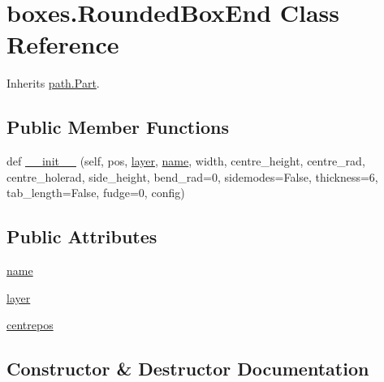 \hypertarget{classboxes_1_1_rounded_box_end}{}\section{boxes.\+Rounded\+Box\+End Class Reference}
\label{classboxes_1_1_rounded_box_end}


Inherits \hyperlink{classpath_1_1_part}{path.\+Part}.

\subsection*{Public Member Functions}
\begin{DoxyCompactItemize}
\item 
def \hyperlink{classboxes_1_1_rounded_box_end_a59c1d8804a33c525d582be8c4667f7ce}{\+\_\+\+\_\+init\+\_\+\+\_\+} (self, pos, \hyperlink{classboxes_1_1_rounded_box_end_a7c010d7f52ed873fb0cac5a8d9d66ef9}{layer}, \hyperlink{classboxes_1_1_rounded_box_end_a45d2a6098b926041ff90261c3a91812d}{name}, width, centre\+\_\+height, centre\+\_\+rad, centre\+\_\+holerad, side\+\_\+height, bend\+\_\+rad=0, sidemodes=False, thickness=6, tab\+\_\+length=False, fudge=0, config)
\end{DoxyCompactItemize}
\subsection*{Public Attributes}
\begin{DoxyCompactItemize}
\item 
\hyperlink{classboxes_1_1_rounded_box_end_a45d2a6098b926041ff90261c3a91812d}{name}
\item 
\hyperlink{classboxes_1_1_rounded_box_end_a7c010d7f52ed873fb0cac5a8d9d66ef9}{layer}
\item 
\hyperlink{classboxes_1_1_rounded_box_end_a765ea9e1db8122190d9c94df02b7a341}{centrepos}
\end{DoxyCompactItemize}


\subsection{Constructor \& Destructor Documentation}
\hypertarget{classboxes_1_1_rounded_box_end_a59c1d8804a33c525d582be8c4667f7ce}{}
